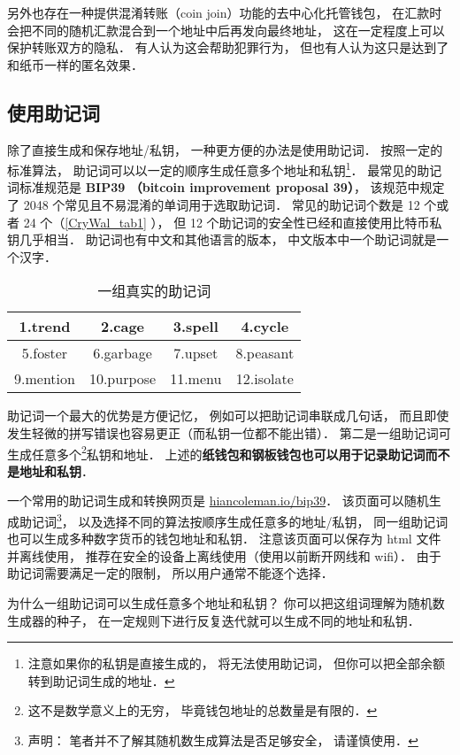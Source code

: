 另外也存在一种提供混淆转账（coin join）功能的去中心化托管钱包， 在汇款时会把不同的随机汇款混合到一个地址中后再发向最终地址， 这在一定程度上可以保护转账双方的隐私． 有人认为这会帮助犯罪行为， 但也有人认为这只是达到了和纸币一样的匿名效果．

\subsection{使用助记词}
除了直接生成和保存地址/私钥， 一种更方便的办法是使用助记词． 按照一定的标准算法， 助记词可以以一定的顺序生成任意多个地址和私钥\footnote{注意如果你的私钥是直接生成的， 将无法使用助记词， 但你可以把全部余额转到助记词生成的地址．}． 最常见的助记词标准规范是 \textbf{BIP39 （bitcoin improvement proposal 39）}， 该规范中规定了 2048 个常见且不易混淆的单词用于选取助记词． 常见的助记词个数是 12 个或者 24 个（\autoref{CryWal_tab1} ）， 但 12 个助记词的安全性已经和直接使用比特币私钥几乎相当． 助记词也有中文和其他语言的版本， 中文版本中一个助记词就是一个汉字．
\begin{table}[ht]
\centering
\caption{一组真实的助记词}\label{CryWal_tab1}
\begin{tabular}{|c|c|c|c|}
\hline
1.trend & 2.cage & 3.spell & 4.cycle \\
\hline
5.foster & 6.garbage & 7.upset & 8.peasant \\
\hline
9.mention & 10.purpose & 11.menu & 12.isolate \\
\hline
\end{tabular}
\end{table}

助记词一个最大的优势是方便记忆， 例如可以把助记词串联成几句话， 而且即使发生轻微的拼写错误也容易更正（而私钥一位都不能出错）． 第二是一组助记词可生成任意多个\footnote{这不是数学意义上的无穷， 毕竟钱包地址的总数量是有限的．}私钥和地址． 上述的\textbf{纸钱包和钢板钱包也可以用于记录助记词而不是地址和私钥}．

一个常用的助记词生成和转换网页是 \href{https://iancoleman.io/bip39/}{hiancoleman.io/bip39}． 该页面可以随机生成助记词\footnote{声明： 笔者并不了解其随机数生成算法是否足够安全， 请谨慎使用．}， 以及选择不同的算法按顺序生成任意多的地址/私钥， 同一组助记词也可以生成多种数字货币的钱包地址和私钥． 注意该页面可以保存为 html 文件并离线使用， 推荐在安全的设备上离线使用（使用以前断开网线和 wifi）． 由于助记词需要满足一定的限制， 所以用户通常不能逐个选择．

为什么一组助记词可以生成任意多个地址和私钥？ 你可以把这组词理解为随机数生成器的种子， 在一定规则下进行反复迭代就可以生成不同的地址和私钥．

